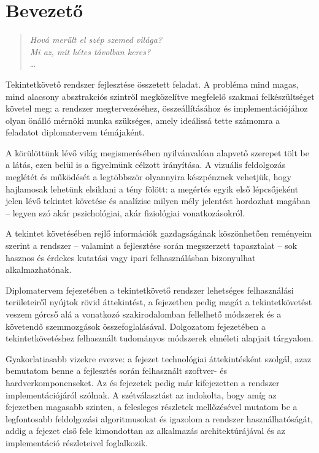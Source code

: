 \chapter*{Bevezető}

\begin{verse}
\begin{flushright}
\emph{Hová merűlt el szép szemed világa? \\
Mi az, mit kétes távolban keres?} \\
\dots
\end{flushright}
\end{verse}

Tekintetkövető rendszer fejlesztése összetett feladat. A probléma mind magas, mind alacsony absztrakciós szintről megközelítve megfelelő szakmai felkészültséget követel meg: a rendszer megtervezéséhez, összeállításához és implementációjához olyan önálló mérnöki munka szükséges, amely ideálissá tette számomra a feladatot diplomatervem témájaként.

\bigskip

A körülöttünk lévő világ megismerésében nyilvánvalóan alapvető szerepet tölt be a látás, ezen belül is a figyelmünk célzott irányítása. A vizuális feldolgozás meglétét és működését a legtöbbször olyannyira készpénznek vehetjük, hogy hajlamosak lehetünk elsiklani a tény fölött: a megértés egyik első lépcsőjeként jelen lévő tekintet követése és analízise milyen mély jelentést hordozhat magában -- legyen szó akár pszichológiai, akár fiziológiai vonatkozásokról.

A tekintet követésében rejlő információk gazdagságának köszönhetően reményeim szerint a rendszer -- valamint a fejlesztése során megszerzett tapasztalat -- sok hasznos és érdekes kutatási vagy ipari felhasználásban bizonyulhat alkalmazhatónak.

\bigskip

Diplomatervem  fejezetében a tekintetkövető rendszer lehetséges felhasználási területeiről nyújtok rövid áttekintést, a  fejezetben pedig magát a tekintetkövetést veszem górcső alá a vonatkozó szakirodalomban fellelhető módszerek és a követendő szemmozgások összefoglalásával. Dolgozatom  fejezetében a tekintetkövetéshez felhasznált tudományos módszerek elméleti alapjait tárgyalom.

Gyakorlatiasabb vizekre evezve: a  fejezet technológiai áttekintésként szolgál, azaz bemutatom benne a fejlesztés során felhasznált szoftver- és hardverkomponenseket. Az  és  fejezetek pedig már kifejezetten a rendszer implementációjáról szólnak. A szétválasztást az indokolta, hogy amíg az  fejezetben magasabb szinten, a felesleges részletek mellőzésével mutatom be a legfontosabb feldolgozási algoritmusokat és igazolom a rendszer használhatóságát, addig a  fejezet első fele kimondottan az alkalmazás architektúrájával és az implementáció részleteivel foglalkozik.

